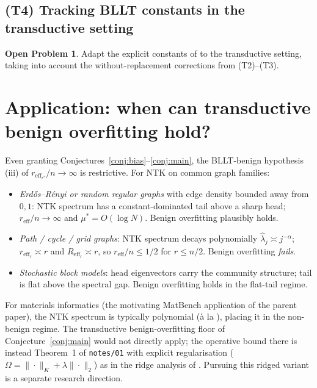\documentclass[11pt,a4paper]{article}
\theoremstyle{plain}
\theoremstyle{definition}
\newtheorem{problem}[theorem]{Open Problem}
\theoremstyle{remark}
\newcommand{\reff}{r_{\mathrm{eff}}}
\newcommand{\Reff}{R_{\mathrm{eff}}}
\begin{document}
\subsection{(T4) Tracking BLLT constants in the transductive
setting}

\begin{problem}
\label{prob:bllt-constants}
Adapt the explicit constants of
\citet[][\S5--6]{BartlettLongLugosiTsigler2020} to the
transductive setting, taking into account the
without-replacement corrections from (T2)--(T3).
\end{problem}

\section{Application: when can transductive benign overfitting hold?}
\label{sec:application}

Even granting Conjectures~\ref{conj:bias}--\ref{conj:main}, the
BLLT-benign hypothesis (iii) of $\reff_{r^*}/n \to \infty$ is
restrictive. For NTK on common graph families:

\begin{itemize}[label=$\bullet$,leftmargin=*]
\item \emph{Erdős--Rényi or random regular graphs} with edge
    density bounded away from $0, 1$: NTK spectrum has a
    constant-dominated tail above a sharp head; $\reff/n \to \infty$
    and $\mu^* = O(\log N)$. Benign overfitting plausibly holds.
\item \emph{Path / cycle / grid graphs}: NTK spectrum decays
    polynomially $\hat\lambda_j \asymp j^{-\alpha}$; $\reff_r \asymp r$
    and $\Reff_r \asymp r$, so $\reff/n \le 1/2$ for $r \le n/2$.
    Benign overfitting \emph{fails}.
\item \emph{Stochastic block models}: head eigenvectors carry the
    community structure; tail is flat above the spectral gap.
    Benign overfitting holds in the flat-tail regime.
\end{itemize}

For materials informatics (the motivating MatBench application of
the parent paper), the NTK spectrum is typically polynomial
(\`a la \citealp{BordelonCanataPehlevan2020}), placing it in the
non-benign regime. The transductive benign-overfitting floor of
Conjecture~\ref{conj:main} would not directly apply; the
operative bound there is instead Theorem~1 of \texttt{notes/01}
with explicit regularisation
($\Omega = \|\cdot\|_K + \lambda\|\cdot\|_2$) as in the ridge
analysis of \citet{TsiglerBartlett2020}. Pursuing this ridged
variant is a separate research direction.
\end{document}
